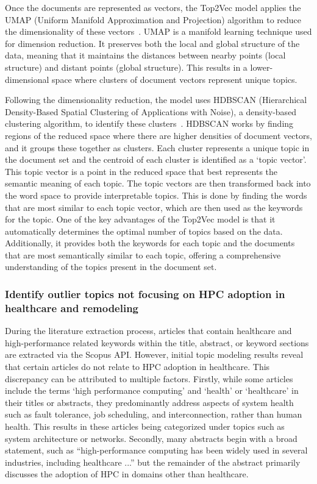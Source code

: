 Once the documents are represented as vectors, the Top2Vec model applies the UMAP (Uniform Manifold Approximation and Projection) algorithm to reduce the dimensionality of these vectors~\cite{mcinnes1802umap}. UMAP is a manifold learning technique used for dimension reduction. It preserves both the local and global structure of the data, meaning that it maintains the distances between nearby points (local structure) and distant points (global structure). This results in a lower-dimensional space where clusters of document vectors represent unique topics. 

Following the dimensionality reduction, the model uses HDBSCAN (Hierarchical Density-Based Spatial Clustering of Applications with Noise), a density-based clustering algorithm, to identify these clusters~\cite{campello2013density}. HDBSCAN works by finding regions of the reduced space where there are higher densities of document vectors, and it groups these together as clusters. Each cluster represents a unique topic in the document set and the centroid of each cluster is identified as a `topic vector'. This topic vector is a point in the reduced space that best represents the semantic meaning of each topic. The topic vectors are then transformed back into the word space to provide interpretable topics. This is done by finding the words that are most similar to each topic vector, which are then used as the keywords for the topic. One of the key advantages of the Top2Vec model is that it automatically determines the optimal number of topics based on the data. Additionally, it provides both the keywords for each topic and the documents that are most semantically similar to each topic, offering a comprehensive understanding of the topics present in the document set.


\subsubsection{Identify outlier topics not focusing on HPC adoption in healthcare and remodeling}\label{subsubse:2-2.3.2}
During the literature extraction process, articles that contain healthcare and high-performance related keywords within the title, abstract, or keyword sections are extracted via the Scopus API. However, initial topic modeling results reveal that certain articles do not relate to HPC adoption in healthcare. This discrepancy can be attributed to multiple factors. Firstly, while some articles include the terms `high performance computing' and `health' or `healthcare' in their titles or abstracts, they predominantly address aspects of system health such as fault tolerance, job scheduling, and interconnection, rather than human health. This results in these articles being categorized under topics such as system architecture or networks. Secondly, many abstracts begin with a broad statement, such as ``high-performance computing has been widely used in several industries, including healthcare ...'' but the remainder of the abstract primarily discusses the adoption of HPC in domains other than healthcare. 

